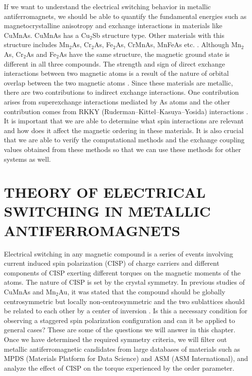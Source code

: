 \documentclass[letterpaper,10pt,doublespacing,edeposit]{uiucthesis2020}
\begin{document}
\begin{mainmatter}
If we want to understand the electrical switching behavior in metallic antiferromagnets, we should be able to quantify the fundamental energies such as magnetocrystalline anisotropy and exchange interactions in materials like CuMnAs. CuMnAs has a Cu$_2$Sb structure type. Other materials with this structure includes Mn$_2$As, Cr$_2$As, Fe$_2$As, CrMnAs, MnFeAs etc. \cite{Lutz-Kappelman2018,Zhang2013,Zhang2015}. Although Mn$_2$As, Cr$_2$As and Fe$_2$As have the same structure, the magnetic ground state is different in all three compounds. The strength and sign of direct exchange interactions between two magnetic atoms is a result of the nature of orbital overlap between the two magnetic atoms \cite{Zhang2013}. Since these materials are metallic, there are two contributions to indirect exchange interactions. One contribution arises from superexchange interactions mediated by As atoms and the other contribution comes from RKKY (Ruderman–Kittel–Kasuya–Yosida) interactions \cite{Zhang2015}. It is important that we are able to determine what spin interactions are relevant and how does it affect the magnetic ordering in these materials. It is also crucial that we are able to verify the computational methods and the exchange coupling values obtained from these methods so that we can use these methods for other systems as well.

\chapter{THEORY OF ELECTRICAL SWITCHING IN METALLIC ANTIFERROMAGNETS}

\vspace{10mm}


Electrical switching in any magnetic compound is a series of events involving current induced spin polarization (CISP) of charge carriers and different components of CISP exerting different torques on the magnetic moments of the atoms. The nature of CISP is set by the crystal symmetry. In previous studies of CuMnAs and Mn$_2$Au, it was stated that the compound should be globally centrosymmetric but locally non-centrosymmetric and the two sublattices should be related to each other by a center of inversion \cite{Zelezny2014,Zelezny2017,Wadley2016}. Is this a necessary condition for observing a staggered spin polarization configuration and can it be applied to general cases? These are some of the questions we will answer in this chapter. Once we have determined the required symmetry criteria, we will filter out metallic antiferromagnetic candidates from large databases of materials such as MPDS (Materials Platform for Data Science) and ASM (ASM International), and analyze the effect of CISP on the torque experienced by the order parameter.


\end{mainmatter}
\end{document}
